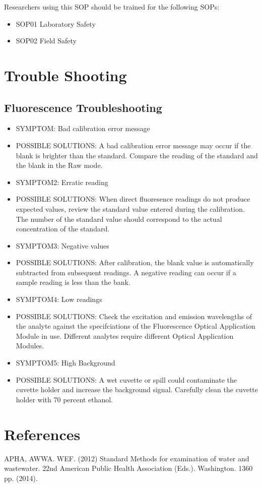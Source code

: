 \documentclass[12pt]{../SOP3_beta}
\begin{document}
\NP Researchers using this SOP should be trained for the following SOPs:

\begin{itemize}
  \item SOP01 Laboratory Safety
  \item SOP02 Field Safety
\end{itemize}

\section{Trouble Shooting}
\subsection{Fluorescence Troubleshooting}
\begin{itemize}
  \item SYMPTOM: Bad calibration error message
  \item POSSIBLE SOLUTIONS: A bad calibration error message may occur if the blank is brighter than the standard. Compare the reading of the standard and the blank in the Raw mode. 
  \item SYMPTOM2: Erratic reading
  \item POSSIBLE SOLUTIONS: When direct fluoresence readings do not produce expected values, review the standard value entered during the calibration. The number of the standard value should correspond to the actual concentration of the standard.
  \item SYMPTOM3: Negative values
  \item POSSIBLE SOLUTIONS: After calibration, the blank value is automatically subtracted from subsequent readings. A negative reading can occur if a sample reading is less than the bank.
  \item SYMPTOM4: Low readings
  \item POSSIBLE SOLUTIONS: Check the excitation and emission wavelengths of the analyte against the specifciations of the Fluorescence Optical Application Module in use. Different analytes require different Optical Application Modules.
  \item SYMPTOM5: High Background
  \item POSSIBLE SOLUTIONS: A wet cuvette or spill could contaminate the cuvette holder and increase the background signal. Carefully clean the cuvette holder with 70 percent ethanol. 
\end{itemize}


\section{References}

\NP APHA, AWWA. WEF. (2012) Standard Methods for examination of water and wastewater. 22nd American Public Health Association (Eds.). Washington. 1360 pp. (2014).
\end{document}
